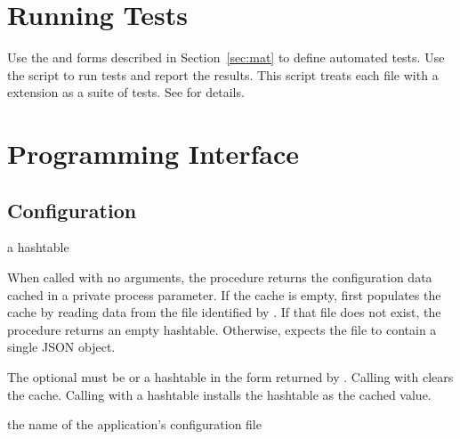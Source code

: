 
\section{Running Tests}

Use the  and  forms described in
Section~\ref{sec:mat} to define automated tests.
Use the  script to run tests and report the results.
This script treats each file with a  extension as a suite of tests.
See  for details.


\section {Programming Interface}

\subsection{Configuration}

\begin{procedure}
\end{procedure}
\returns{} a hashtable

When called with no arguments, the  procedure
returns the configuration data cached in a private process parameter.
If the cache is empty,  first populates the cache by reading
data from the file identified by .
If that file does not exist, the procedure returns an empty hashtable.
Otherwise,  expects the file to contain a single JSON object.

The optional  must be  or a hashtable in the form returned by
.
Calling  with  clears the cache.
Calling  with a hashtable installs the hashtable as the cached value.

\begin{procedure}
\end{procedure}
\returns{} the name of the application's configuration file

